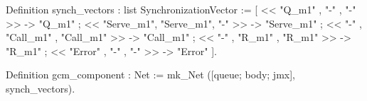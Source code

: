 Definition synch_vectors : list SynchronizationVector := 
  [ << "Q_m1"    , "-"       , "-"       >> -> "Q_m1"     ;
    << "Serve_m1", "Serve_m1", "-"       >> -> "Serve_m1" ;
    << "-"       , "Call_m1" , "Call_m1" >> -> "Call_m1"  ;
    << "-"       , "R_m1"    , "R_m1"    >> -> "R_m1"     ;
    << "Error"   , "-"       , "-"       >> -> "Error"    ].

Definition gcm_component : Net :=
  mk_Net ([queue; body; jmx], synch_vectors).